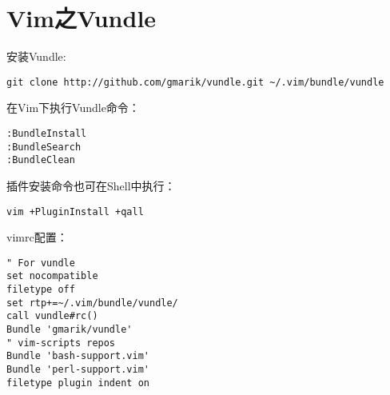 
\section{Vim之Vundle}
安装Vundle:
\begin{verbatim}
git clone http://github.com/gmarik/vundle.git ~/.vim/bundle/vundle
\end{verbatim}

在Vim下执行Vundle命令：
\begin{verbatim}
:BundleInstall
:BundleSearch
:BundleClean
\end{verbatim}


插件安装命令也可在Shell中执行：
\begin{verbatim}
vim +PluginInstall +qall
\end{verbatim}


vimrc配置：

\begin{verbatim}
" For vundle
set nocompatible
filetype off
set rtp+=~/.vim/bundle/vundle/
call vundle#rc()
Bundle 'gmarik/vundle'
" vim-scripts repos
Bundle 'bash-support.vim'
Bundle 'perl-support.vim'
filetype plugin indent on
\end{verbatim}



